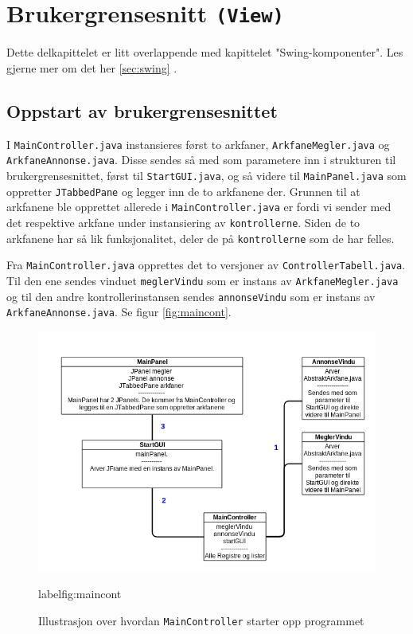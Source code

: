 \section{Brukergrensesnitt \texttt{(View)}} \label{sec:brukergrensesnitt}

Dette delkapittelet er litt overlappende med kapittelet "Swing-komponenter". Les gjerne mer om det her \ref{sec:swing} \pageref{sec:swing}.

\subsection{Oppstart av brukergrensesnittet}
I \texttt{MainController.java} instansieres først to arkfaner, \texttt{ArkfaneMegler.java} og \texttt{ArkfaneAnnonse.java}.
Disse sendes så med som parametere inn i strukturen til brukergrensesnittet, først til \texttt{StartGUI.java}, og så videre til \texttt{MainPanel.java} som oppretter \texttt{JTabbedPane} og legger inn de to arkfanene der.
Grunnen til at arkfanene ble opprettet allerede i \texttt{MainController.java} er fordi vi sender med det respektive arkfane under instansiering av \texttt{kontrollerne}. 
Siden de to arkfanene har så lik funksjonalitet, deler de på \texttt{kontrollerne} som de har felles.

Fra \texttt{MainController.java} opprettes det to versjoner av \texttt{ControllerTabell.java}. Til den ene sendes vinduet \texttt{meglerVindu} som er instans av \texttt{ArkfaneMegler.java} og til den andre kontrollerinstansen sendes \texttt{annonseVindu} som er instans av \texttt{ArkfaneAnnonse.java}.
Se figur \ref{fig:maincont}.

\begin{figure}[ht]
\includegraphics[width=\textwidth,height=\textheight,keepaspectratio]{./img/produktdokumentasjon/bilder/Controller_og_GUI-opprettelse2.png}
\caption{Illustrasjon over hvordan \texttt{MainController} starter opp programmet}
label{fig:maincont}
\end{figure}


